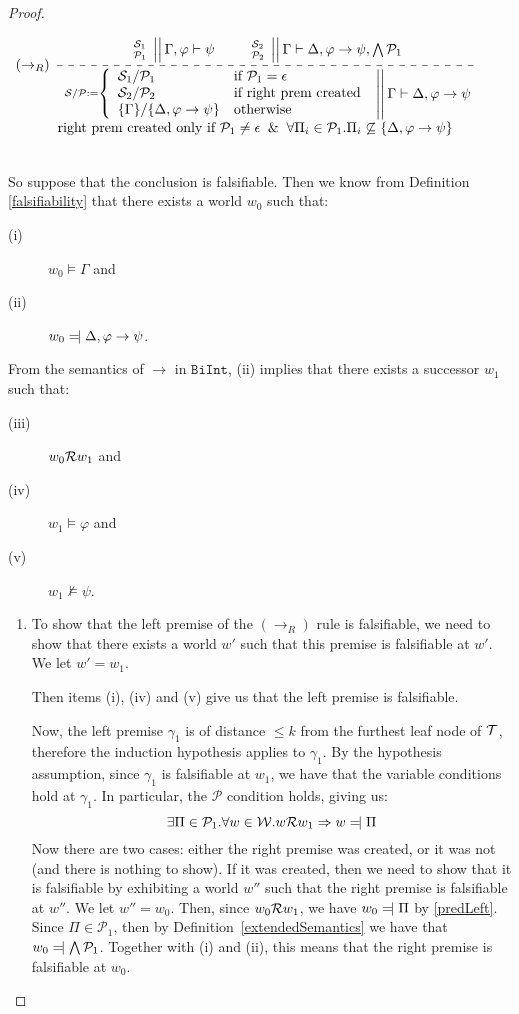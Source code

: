 \documentclass{llncs}
\numberwithin{equation}{section}
\newcommand{\Pred}{{\mathcal{P}}}
\newcommand{\Succ}{{\mathcal{S}}}
\newcommand{\Lg}[1]{\mathtt{#1}}
\newcommand{\ExImp}{\rightarrow}
\newcommand{\sequent}{\vdash}
\newcommand{\bruleSideCondEx}[5]{
        $
        \begin{array}{l}
                                                                                                \AxiomC{#2}
                                                                                                \AxiomC{#3}
                        \dashedLine \LeftLabel{$#1$}    \BinaryInfC{#4} 
                \DisplayProof
        \\
                #5
        \end{array}
        $
}
\newcommand{\Imp}{\rightarrow}
\newcommand{\Force}{\vDash}
\newcommand{\NotForce}{\nvDash}
\def\Reject{=\joinrel\mathrel|}
\newcommand{\MetaImp}{\Rightarrow}
\newcommand{\stacked}[2]{
\genfrac{}{}{0pt}{}{#1}{#2} 
 }
\newcommand{\mycal}[1]{
        {\cal{#1}}
}
\newcommand{\Sequent}[4]{
        \left. \left. \begin{array}{l} \hspace{-5pt} \stacked{#1}{#2}  \hspace{-5pt}\end{array} \ \right|\right| #3 \sequent #4
}
\newcommand {\BiInt}{
        \Lg{BiInt}
}
\newcommand{\tree}[1]{
        {\mycal{#1}}
}
\newcommand{\ImpRightRule}{({\Imp_R})}
\newcommand{\varsTrans}[5]{
#1 := 
\left\{ \begin{array}{ll}
        #2                                                                              & \mbox{if }    #5 = \epsilon \\                                                                                                                                                                
        #3                                                                              & \mbox{if}     \text{ right prem created} \\ 
        #4                                                                              & \mbox{otherwise} \\
        \end{array}\right.
}
\newcommand{\RuleDefImpRight}
{
        \bruleSideCondEx{\ImpRightRule}
        {$\Sequent{\Succ_1}{\Pred_1}{\Gamma, \varphi}{\psi}$}
        {$\Sequent{\Succ_2}{\Pred_2}{\Gamma}{\Delta, \varphi \Imp \psi, \bigwedge \Pred_1}$}    
{$\Sequent{\varsTrans{\Succ/\Pred}{\Succ_1/\Pred_1}{\Succ_2/\Pred_2}{\{ \Gamma \}/\{ \Delta, \varphi \ExImp \psi \}}{\Pred_1}}{}{\Gamma}{\Delta, \varphi \ExImp \psi}$}
{\text{\ \ \ \ \ \ \ \ \ right prem created only if } \Pred_1 \ne \epsilon \And \forall \Pi_i \in \Pred_1 . \Pi_i \not\subseteq \{ \Delta, \varphi \ExImp \psi \}}
}
\begin{document}
\begin{proof}
\begin{description}
\begin{enumerate}
{\scriptsize{\RuleDefImpRight}}\\

So suppose that the conclusion is falsifiable. Then we know from Definition \ref{falsifiability} that there exists a world $w_0$ such that:
		\begin{description}
			\item[\rm{(i)}] $w_0 \Force \Gamma$ and
			\item[\rm{(ii)}] $w_0 \Reject \Delta, \varphi \ExImp \psi$.
		\end{description}
	From the semantics of $\ExImp$ in $\BiInt$, (ii) implies that there exists a successor $w_1$ such that:
		\begin{description}
			\item[\rm{(iii)}] $w_0 \mycal{R} w_1$ and 		
			\item[\rm{(iv)}] $w_1 \Force \varphi$ and 
			\item[\rm{(v)}] $w_1 \NotForce \psi$.
		\end{description}	

		\begin{enumerate}
			\item\label{leftFalsifiable} To show that the left premise of the $\ImpRightRule$ rule is falsifiable, we need to show that there exists a world $w'$ such that this premise is falsifiable at $w'$. We let $w' = w_1$.
		
		Then items (i), (iv) and (v) give us that the left premise is falsifiable.
		
		Now, the left premise $\gamma_1$ is of distance $\leq k$ from the furthest leaf node of $\tree{T}$, therefore the induction hypothesis applies to $\gamma_1$. By the hypothesis assumption, since $\gamma_1$ is falsifiable at $w_1$, we have that the variable conditions hold at $\gamma_1$. In particular, the $\Pred$ condition holds, giving us:
\begin{equation}\label{predLeft}
	\exists \Pi \in \Pred_1 . \forall w \in \mycal{W} . w \mycal{R} w_1\MetaImp w \Reject \Pi
\end{equation}
		Now there are two cases: either the right premise was created, or it was not (and there is nothing to show). If it was created, then we need to show that it is falsifiable by exhibiting a world $w''$ such that the right premise is falsifiable at $w''$. We let $w'' = w_0$.
Then, since $w_0 \mycal{R} w_1$, we have $w_0 \Reject \Pi$ by \eqref{predLeft}. Since $\Pi \in \Pred_1$, then by Definition~\ref{extendedSemantics} we have that $w_0 \Reject \bigwedge \Pred_1$. Together with (i) and (ii), this means that the right premise is falsifiable at $w_0$.
		

\end{enumerate}
\end{enumerate}
\end{description}
\end{proof}
\end{document}

